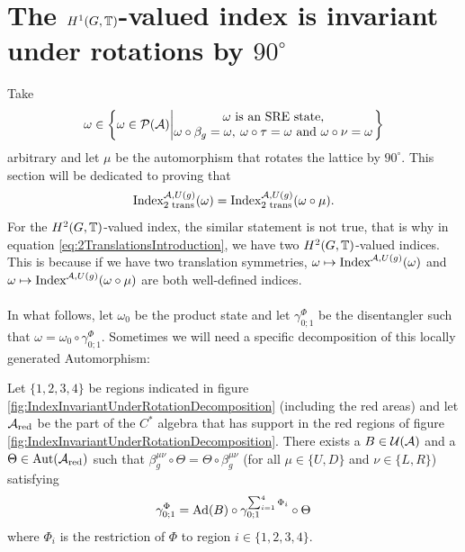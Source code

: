 \documentclass[11pt,a4paper,twoside]{article}
\numberwithin{equation}{section}
\begin{document}
	\section{The \texorpdfstring{$H^1(G,\TT)$}{H1}-valued index is invariant under rotations by \texorpdfstring{$90^\circ$}{90}}\label{sec:H1ValuedIndexInvariantUnderRotations}
	Take
	\begin{equation}
		\omega\in\left\{\omega\in\PP(\AA)\left| \begin{matrix}\omega\text{ is an SRE state,}\\\omega\circ\beta_g=\omega,\:\omega\circ\tau=\omega\text{ and }\omega\circ\nu=\omega\end{matrix} \right.\right\}
	\end{equation}
	arbitrary and let $\mu$ be the automorphism that rotates the lattice by $90^\circ$. This section will be dedicated to proving that
	\begin{equation}
		\textrm{Index}_{\text{2 trans}}^{\AA,U(g)}(\omega)=\textrm{Index}_{\text{2 trans}}^{\AA,U(g)}(\omega\circ\mu).
	\end{equation}
	For the $H^2(G,\TT)$-valued index, the similar statement is not true, that is why in equation \eqref{eq:2TranslationsIntroduction}, we have two $H^2(G,\TT)$-valued indices. This is because if we have two translation symmetries, $\omega\mapsto\textrm{Index}^{\AA,U(g)}(\omega)$ and $\omega\mapsto\textrm{Index}^{\AA,U(g)}(\omega\circ\mu)$ are both well-defined indices.
	\\\\
	In what follows, let $\omega_0$ be the product state and let $\gamma^\Phi_{0;1}$ be the disentangler such that $\omega=\omega_0\circ\gamma^\Phi_{0;1}$. Sometimes we will need a specific decomposition of this locally generated Automorphism:
	
	\begin{lemma}\label{lem:DecompositionOfLGAInCross}
		Let $\{1,2,3,4\}$ be regions indicated in figure \ref{fig:IndexInvariantUnderRotationDecomposition} (including the red areas) and let $\AA_{\text{red}}$ be the part of the $C^*$ algebra that has support in the red regions of figure \ref{fig:IndexInvariantUnderRotationDecomposition}. There exists a $B\in\UU(\AA)$ and a $\Theta\in\Aut{\AA_{\text{red}}}$ such that $\beta^{\mu\nu}_g\circ\Theta=\Theta\circ\beta^{\mu\nu}_g$ (for all $\mu\in\{U,D\}$ and $\nu\in\{L,R\}$) satisfying
		\begin{equation}
			\gamma^\Phi_{0;1}=\Ad{B}\circ\gamma^{\sum_{i=1}^4\Phi_i}_{0;1}\circ\Theta
		\end{equation}
		where $\Phi_i$ is the restriction of $\Phi$ to region $i\in\{1,2,3,4\}$.
	\end{lemma}
\end{document}
